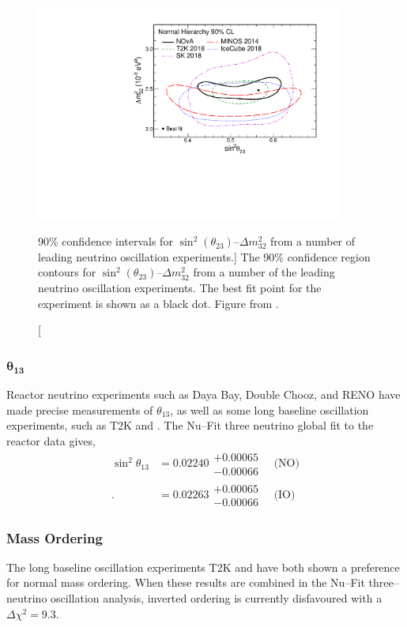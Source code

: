 \begin{figure}
	\centering
	\includegraphics[width=0.9\textwidth]{figures/theta23_msquare.pdf}
	\caption 
	[90\% confidence intervals for $\sin^2 (\theta_{23})$--$\Delta m^2_{32}$ from
	a number of leading neutrino oscillation experiments.]
	{The 90\% confidence region contours for 
	$\sin^2 (\theta_{23})$--$\Delta m^2_{32}$ from a number of the leading 
	neutrino oscillation experiments\cite{PhysRevD.96.092006, PhysRevLett.112.191801, PhysRevLett.123.151803}. 
	The best fit point for the \nova{} experiment is shown as a black dot.  
	Figure from \cite{PhysRevLett.123.151803}.}
	\label{fig:delm_sin23}
\end{figure}

\subsubsection*{$\boldsymbol{\theta_{13}}$}
Reactor neutrino experiments such as Daya Bay\cite{An:2012eh}, Double 
Chooz\cite{Abe:2013sxa}, and RENO\cite{Ahn:2012nd} have made precise
measurements of $\theta_{13}$, as well as some long baseline oscillation 
experiments, such as T2K and \nova{}. The Nu--Fit three neutrino global fit to 
the reactor data gives,
\begin{align*}
	\sin^2 \theta_{13} &= 0.02240 \substack{+ 0.00065 \\ - 0.00066} \quad \mbox{(NO)} \\ .
	                   &= 0.02263 \substack{+ 0.00065 \\ - 0.00066} \quad \mbox{(IO)}  
\end{align*}

\subsubsection*{Mass Ordering}
The long baseline oscillation experiments T2K and \nova{} have both shown a
preference for normal mass 
ordering\cite{PhysRevD.96.092006,PhysRevLett.123.151803}. When these results are
combined in the Nu--Fit three--neutrino oscillation analysis, inverted 
ordering is currently disfavoured with a $\Delta \chi^2 = 9.3$.

